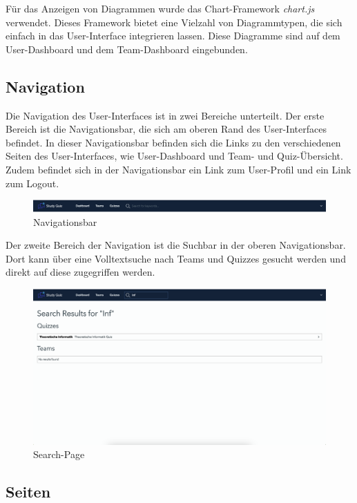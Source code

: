 \noindent Für das Anzeigen von Diagrammen wurde das Chart-Framework \textit{chart.js} verwendet.
Dieses Framework bietet eine Vielzahl von Diagrammtypen, die sich einfach in das
User-Interface integrieren lassen. Diese Diagramme sind auf dem User-Dashboard 
und dem Team-Dashboard eingebunden.

\subsection{Navigation}

Die Navigation des User-Interfaces ist in zwei Bereiche unterteilt. 
Der erste Bereich ist die Navigationsbar, die sich am oberen Rand des User-Interfaces befindet.
In dieser Navigationsbar befinden sich die Links zu den verschiedenen Seiten des User-Interfaces,
wie User-Dashboard und Team- und Quiz-Übersicht. Zudem befindet sich in der Navigationsbar
ein Link zum User-Profil und ein Link zum Logout.

\begin{figure}[H]
  \includegraphics[width=\linewidth]{img/navbar.png}
  \caption{Navigationsbar}
  \label{fig:navbar}
\end{figure}

Der zweite Bereich der Navigation ist die Suchbar in der oberen Navigationsbar. 
Dort kann über eine Volltextsuche nach Teams und Quizzes gesucht werden und 
direkt auf diese zugegriffen werden.

\begin{figure}[H]
  \includegraphics[width=\linewidth]{img/suche.png}
  \caption{Search-Page}
  \label{fig:searchbar}
\end{figure}
\subsection{Seiten}

